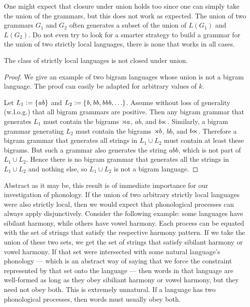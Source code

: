 One might expect that closure under union holds too since one can simply take the union of the grammars, but this does not work as expected.
The union of two grammars $G_1$ and $G_2$ often generates a subset of the union of $L(G_1)$ and $L(G_2)$.
Do not even try to look for a smarter strategy to build a grammar for the union of two strictly local languages, there is none that works in all cases.
%
\begin{lemma}
    The class of strictly local languages is not closed under union. 
\end{lemma}
%
\begin{proof}
    We give an example of two bigram languages whose union is not a bigram language.
    The proof can easily be adapted for arbitrary values of $k$.

    Let $L_1 \mathrel{\mathop:}= \left \{ \mathit{ab} \right \}$ and $L_2 \mathrel{\mathop:}= \left \{ \mathit{b}, \mathit{bb}, \mathit{bbb}, \ldots \right \}$.
    Assume without loss of generality (w.l.o.g.) that all bigram grammars are positive.
    Then any bigram grammar that generates $L_1$ must contain the bigrams $\rtimes a$, $\mathit{ab}$, and $b \ltimes$.
    Similarly, a bigram grammar generating $L_2$ must contain the bigrams $\rtimes b$, $\mathit{bb}$, and $b \ltimes$.
    Therefore a bigram grammar that generates all strings in $L_1 \cup L_2$ must contain at least these bigrams.
    But such a grammar also generates the string $\mathit{abb}$, which is not part of $L_1 \cup L_2$.
    Hence there is no bigram grammar that generates all the strings in $L_1 \cup L_2$ and nothing else, so $L_1 \cup L_2$ is not a bigram language.
\end{proof}
%
Abstract as it may be, this result is of immediate importance for our investigation of phonology.
If the union of two arbitrary strictly local languages were also strictly local, then we would expect that phonological processes can always apply disjunctively.
Consider the following example: some languages have sibilant harmony, while others have vowel harmony.
Each process can be equated with the set of strings that satisfy the respective harmony pattern.
If we take the union of these two sets, we get the set of strings that satisfy sibilant harmony or vowel harmony.
If that set were intersected with some natural language's phonology --- which is an abstract way of saying that we force the constraint represented by that set onto the language --- then words in that language are well-formed as long as they obey sibiliant harmony or vowel harmony, but they need not obey both.
This is extremely unnatural. If a language has two phonological processes, then words must usually obey both.
